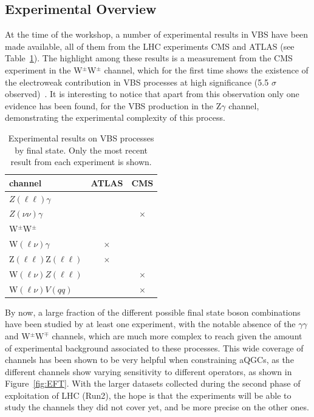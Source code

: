 \label{WG2}

\subsection{Experimental Overview}
 
At the time of the workshop, a number of experimental results in VBS have been made available, all of them from the LHC experiments CMS and ATLAS (see Table~\ref{tab:wg2:expres}). The highlight among these results is a measurement from the CMS experiment in the W$^\pm$W$^\pm$ channel, which for the first time shows the existence of the electroweak contribution in VBS processes at high significance (5.5 $\sigma$ observed)~\cite{CMS:2017adb}. It is interesting to notice that apart from this observation only one evidence has been found, for the VBS production in the Z$\gamma$ channel, demonstrating the experimental complexity of this process. 

\begin{table}[htb]
\centering
\begin{tabular}{|l|c|c|}
    \hline
    channel & ATLAS & CMS \\
    \hline
    $Z(\ell\ell)\gamma$ & \cite{Aaboud:2017pds} & \cite{Khachatryan:2017jub} \\
    $Z(\nu\nu)\gamma$ &  \cite{Aaboud:2017pds}& $\times$ \\
    W$^\pm$W$^\pm$ & \cite{Aaboud:2016ffv} & \cite{CMS:2017adb} \\
    W$(\ell\nu)\gamma$ & $\times$ & \cite{Khachatryan:2016vif} \\
    Z$(\ell\ell)$Z$(\ell\ell)$&  $\times$  & \cite{CMS-PAS-SMP-17-006} \\
    W$(\ell\nu)Z(\ell\ell)$ & \cite{Aad:2016ett} & $\times$ \\
    W$(\ell\nu)V(qq)$ & \cite{Aaboud:2016uuk} & $\times$ \\
    \hline
  \end{tabular}  
\caption{\label{tab:wg2:expres} Experimental results on VBS processes by final state. Only the most recent result from each experiment is shown.}
\end{table}

By now, a large fraction of the different possible final state boson combinations have been studied by at least one experiment, with the notable absence of the $\gamma\gamma$ and W$^\pm$W$^\mp$ channels, which are much more complex to reach given the amount of experimental background associated to these processes. This wide coverage of channels has been shown to be very helpful when constraining aQGCs, as the different channels show varying sensitivity to different operators, as shown in Figure~\ref{fig:EFT}.
With the larger datasets collected during the second phase of exploitation of LHC (Run2), the hope is that the experiments will be able to study the channels they did not cover yet, and be more precise on the other ones. 

